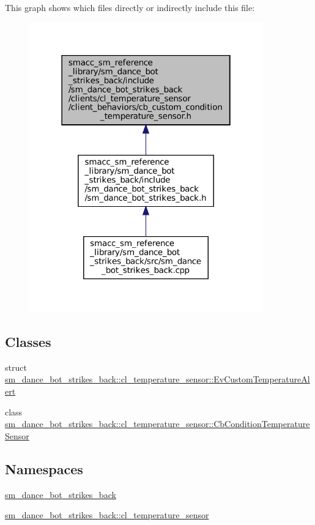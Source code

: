This graph shows which files directly or indirectly include this file\+:
\nopagebreak
\begin{figure}[H]
\begin{center}
\leavevmode
\includegraphics[width=286pt]{strikes__back_2include_2sm__dance__bot__strikes__back_2clients_2cl__temperature__sensor_2client_37d1f66d65dcd489a5253abc5433f39a}
\end{center}
\end{figure}
\subsection*{Classes}
\begin{DoxyCompactItemize}
\item 
struct \hyperlink{structsm__dance__bot__strikes__back_1_1cl__temperature__sensor_1_1EvCustomTemperatureAlert}{sm\+\_\+dance\+\_\+bot\+\_\+strikes\+\_\+back\+::cl\+\_\+temperature\+\_\+sensor\+::\+Ev\+Custom\+Temperature\+Alert}
\item 
class \hyperlink{classsm__dance__bot__strikes__back_1_1cl__temperature__sensor_1_1CbConditionTemperatureSensor}{sm\+\_\+dance\+\_\+bot\+\_\+strikes\+\_\+back\+::cl\+\_\+temperature\+\_\+sensor\+::\+Cb\+Condition\+Temperature\+Sensor}
\end{DoxyCompactItemize}
\subsection*{Namespaces}
\begin{DoxyCompactItemize}
\item 
 \hyperlink{namespacesm__dance__bot__strikes__back}{sm\+\_\+dance\+\_\+bot\+\_\+strikes\+\_\+back}
\item 
 \hyperlink{namespacesm__dance__bot__strikes__back_1_1cl__temperature__sensor}{sm\+\_\+dance\+\_\+bot\+\_\+strikes\+\_\+back\+::cl\+\_\+temperature\+\_\+sensor}
\end{DoxyCompactItemize}
